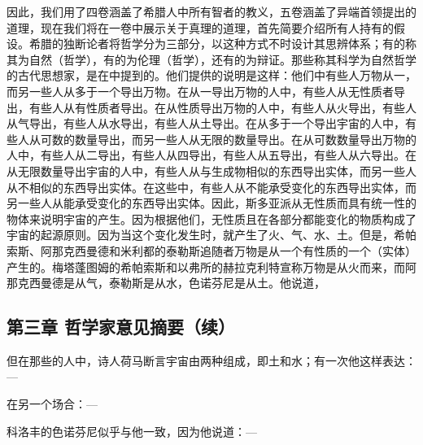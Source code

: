 因此，我们用了四卷涵盖了希腊人中所有智者的教义，五卷涵盖了异端首领提出的道理，现在我们将在一卷中展示关于真理的道理，首先简要介绍所有人持有的假设。希腊的独断论者将哲学分为三部分，以这种方式不时设计其思辨体系；有的称其为自然（哲学），有的为伦理（哲学），还有的为辩证。那些称其科学为自然哲学的古代思想家，是在中提到的。他们提供的说明是这样：他们中有些人万物从一，而另一些人从多于一个导出万物。在从一导出万物的人中，有些人从无性质者导出，有些人从有性质者导出。在从性质导出万物的人中，有些人从火导出，有些人从气导出，有些人从水导出，有些人从土导出。在从多于一个导出宇宙的人中，有些人从可数的数量导出，而另一些人从无限的数量导出。在从可数数量导出万物的人中，有些人从二导出，有些人从四导出，有些人从五导出，有些人从六导出。在从无限数量导出宇宙的人中，有些人从与生成物相似的东西导出实体，而另一些人从不相似的东西导出实体。在这些中，有些人从不能承受变化的东西导出实体，而另一些人从能承受变化的东西导出实体。因此，斯多亚派从无性质而具有统一性的物体来说明宇宙的产生。因为根据他们，无性质且在各部分都能变化的物质构成了宇宙的起源原则。因为当这个变化发生时，就产生了火、气、水、土。但是，希帕索斯、阿那克西曼德和米利都的泰勒斯追随者万物是从一个有性质的一个（实体）产生的。梅塔蓬图姆的希帕索斯和以弗所的赫拉克利特宣称万物是从火而来，而阿那克西曼德是从气，泰勒斯是从水，色诺芬尼是从土。他说道，\par


\subsection{第三章 哲学家意见摘要（续）}

但在那些的人中，诗人荷马断言宇宙由两种组成，即土和水；有一次他这样表达：—\par

\par

在另一个场合：—\par

\par

科洛丰的色诺芬尼似乎与他一致，因为他说道：—\par

\par

